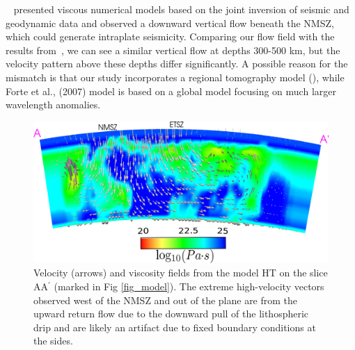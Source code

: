 \documentclass[draft,linenumbers]{agujournal2018}
\begin{document}
~\citet{forte2007descent} presented viscous numerical models based on the joint inversion of seismic and geodynamic data and observed a downward vertical flow beneath the NMSZ, which could generate intraplate seismicity. Comparing our flow field with the results from~\citet{forte2007descent}, we can see a similar vertical flow at depths 300-500 km, but the velocity pattern above these depths differ significantly. A possible reason for the mismatch is that our study incorporates a regional tomography model (\citep{Biryol_2016}), while Forte et al., (2007) model is based on a global model focusing on much larger wavelength anomalies.
%    
\begin{figure}[ht]
    \centering
    \includegraphics[width=0.9\linewidth]{figures/velocity_pattern.png}
    \caption{Velocity (arrows) and viscosity fields from the model HT on the slice AA$^{\prime}$ (marked in Fig \ref{fig_model}). The extreme high-velocity vectors observed west of the NMSZ and out of the plane are from the upward return flow due to the downward pull of the lithospheric drip and are likely an artifact due to fixed boundary conditions at the sides.}
    \label{velocity_pattern}
\end{figure}     
%
\end{document}
